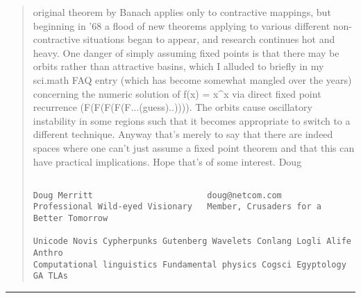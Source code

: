 \begin{quote}
original theorem by Banach applies only to contractive mappings, but
beginning in '68 a flood of new theorems applying to various different
non-contractive situations began to appear, and research continues hot
and heavy. One danger of simply assuming fixed points is that there may
be orbits rather than attractive basins, which I alluded to briefly in
my sci.math FAQ entry (which has become somewhat mangled over the
years) concerning the numeric solution of f(x) = x^x via direct fixed
point recurrence (F(F(F(F(F...(guess)..)))). The orbits cause oscillatory
instability in some regions such that it becomes appropriate to switch to
a different technique.
Anyway that's merely to say that there are indeed spaces where one
can't just assume a fixed point theorem and that this can have practical
implications.
Hope that's of some interest.
	Doug

\begin{verbatim}

Doug Merritt                       doug@netcom.com
Professional Wild-eyed Visionary   Member, Crusaders for a Better Tomorrow

Unicode Novis Cypherpunks Gutenberg Wavelets Conlang Logli Alife Anthro
Computational linguistics Fundamental physics Cogsci Egyptology GA TLAs
\end{verbatim}
    
\end{quote}



\par\noindent\rule{\textwidth}{0.4pt}
